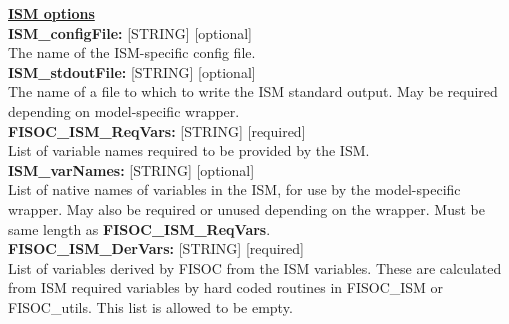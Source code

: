 \documentclass[11pt]{article}
\begin{document}
\begin{flushleft}
\textbf{\underline{ISM options}} \\
\vspace{6pt}
\textbf{ISM\_configFile:}     [STRING] [optional]                          \\
The name of the ISM-specific config file.                                  \\
\vspace{6pt}
\textbf{ISM\_stdoutFile:}     [STRING] [optional]                          \\
The name of a file to which to write the ISM standard output.  May be 
required depending on model-specific wrapper.                              \\
\vspace{6pt}
\textbf{FISOC\_ISM\_ReqVars:} [STRING] [required]                          \\
List of variable names required to be provided by the ISM.                 \\
\vspace{6pt}
\textbf{ISM\_varNames:} [STRING] [optional]                                \\
List of native names of variables in the ISM, for use by the model-specific 
wrapper.  May also be required or unused depending on the wrapper. Must be 
same length as \textbf{FISOC\_ISM\_ReqVars}.                               \\
\vspace{6pt}
\textbf{FISOC\_ISM\_DerVars:} [STRING] [required]                          \\
List of variables derived by FISOC from the ISM variables. These are 
calculated from ISM required variables by hard coded routines in 
FISOC\_ISM or FISOC\_utils. This list is allowed to be empty.              \\
\vspace{6pt}

\end{flushleft}
\end{document}
